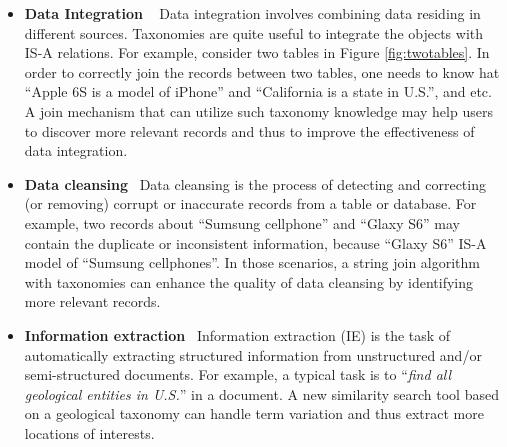 \begin{itemize}
  \item \textbf{Data Integration} ~ Data integration involves combining data residing in different sources. Taxonomies are quite useful to  integrate the objects with IS-A relations. For example, consider two tables in Figure \ref{fig:twotables}. In order to correctly join the records between two tables, one needs to know hat ``\textsf{Apple 6S is a model of iPhone}'' and ``\textsf{California is a state in U.S.}'', and etc. A join mechanism that can utilize such taxonomy knowledge may help users to discover more relevant records and thus to improve the effectiveness of data integration.

       \item \textbf{Data cleansing}~  Data cleansing is the process of detecting and correcting (or removing) corrupt or inaccurate records from a table or database. For example, two records about ``\textsf{Sumsung cellphone}'' and ``\textsf{Glaxy S6}'' may contain the duplicate or inconsistent information, because ``\textsf{Glaxy S6}'' IS-A model of ``\textsf{Sumsung cellphones}''. In those scenarios, a string join algorithm with taxonomies can enhance the quality of data cleansing by identifying more relevant records.

  \item \textbf{Information extraction}~  Information extraction (IE) is the task of automatically extracting structured information from unstructured and/or semi-structured documents. For example, a typical task is to ``\textit{find all geological entities in U.S.}'' in a document. A new similarity search tool based on a geological taxonomy can handle term variation and thus extract more locations of interests.
\end{itemize}










